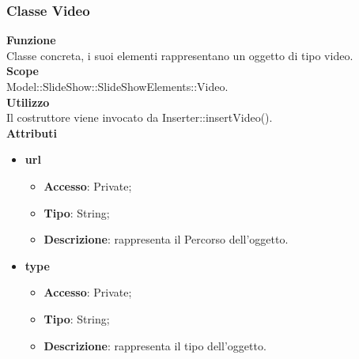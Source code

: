 {	\subsubsection{Classe Video}{
		\label{Video}
		\textbf{Funzione}\\
			\indent Classe concreta, i suoi elementi rappresentano un oggetto di tipo video.\\
	   	\textbf{Scope}\\
			\indent Model::SlideShow::SlideShowElements::Video.\\
		\textbf{Utilizzo}\\
			\indent Il costruttore viene invocato da Inserter::insertVideo().\\
		\textbf{Attributi}
		\begin{itemize}
			\item \textbf{url}
			\begin{itemize}
				\item \textbf{Accesso}: Private;
				\item \textbf{Tipo}: String;
				\item \textbf{Descrizione}: rappresenta il Percorso dell’oggetto.
			\end{itemize}
			\item \textbf{type}
			\begin{itemize}
				\item \textbf{Accesso}: Private;
				\item \textbf{Tipo}: String;
				\item \textbf{Descrizione}: rappresenta il tipo dell'oggetto.
			\end{itemize}
		\end{itemize}
		}

}
